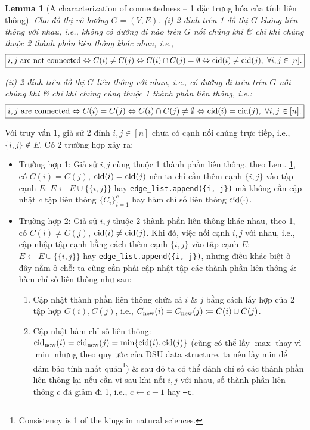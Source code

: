 \documentclass{article}
\newtheorem{lemma}{Lemma}
\begin{document}
\begin{lemma}[A characterization of connectedness -- 1 đặc trưng hóa của tính liên thông]
    \label{lem: characterization connectedness}
    Cho đồ thị vô hướng $G = (V,E)$.
    (i) 2 đỉnh trên 1 đồ thị $G$ không liên thông với nhau, i.e., không có đường đi nào trên $G$ nối chúng khi \& chỉ khi chúng thuộc 2 thành phần liên thông khác nhau, i.e.,
    \begin{equation*}
        \boxed{i,j\mbox{ are not connected}\Leftrightarrow C(i)\ne C(j)\Leftrightarrow C(i)\cap C(j) = \emptyset\Leftrightarrow{\rm cid}(i)\ne{\rm cid}(j),\ \forall i,j\in[n].}
    \end{equation*}
    \item(ii) 2 đỉnh trên đồ thị $G$ liên thông với nhau, i.e., có đường đi trên trên $G$ nối chúng khi \& chỉ khi chúng cùng thuộc 1 thành phần liên thông, i.e.:
    \begin{equation*}
        \boxed{i,j\mbox{ are connected}\Leftrightarrow C(i) = C(j)\Leftrightarrow C(i)\cap C(j)\ne\emptyset\Leftrightarrow{\rm cid}(i) = {\rm cid}(j),\ \forall i,j\in[n].}
    \end{equation*}
\end{lemma}
Với truy vấn 1, giả sử 2 đỉnh $i,j\in[n]$ chưa có cạnh nối chúng trực tiếp, i.e., $\{i,j\}\notin E$. Có 2 trường hợp xảy ra:
\begin{itemize}
    \item Trường hợp 1: Giả sử $i,j$ cùng thuộc 1 thành phần liên thông, theo Lem. \ref{lem: characterization connectedness}, có $C(i) = C(j)$, ${\rm cid}(i) = {\rm cid}(j)$ nên ta chỉ cần thêm cạnh $\{i,j\}$ vào tập cạnh $E$: $E\leftarrow E\cup\{\{i,j\}\}$ hay \verb|edge_list.append({i, j})| mà không cần cập nhật $c$ tập liên thông $\{C_i\}_{i=1}^c$ hay hàm chỉ số liên thông ${\rm cid}(\cdot)$.
    \item Trường hợp 2: Giả sử $i,j$ thuộc 2 thành phần liên thông khác nhau, theo \ref{lem: characterization connectedness}, có $C(i)\ne C(j)$, ${\rm cid}(i)\ne {\rm cid}(j)$. Khi đó, việc nối cạnh $i,j$ với nhau, i.e., cập nhập tập cạnh bằng cách thêm cạnh $\{i,j\}$ vào tập cạnh $E$: $E\leftarrow E\cup\{\{i,j\}\}$ hay \verb|edge_list.append({i, j})|, nhưng điều khác biệt ở đây nằm ở chỗ: ta cũng cần phải cập nhật tập các thành phần liên thông \& hàm chỉ số liên thông như sau:
    \begin{enumerate}
        \item Cập nhật thành phần liên thông chứa cả $i$ \& $j$ bằng cách lấy hợp của 2 tập hợp $C(i),C(j)$, i.e., $C_{\rm new}(i) = C_{\rm new}(j)\coloneqq C(i)\cup C(j)$.
        \item Cập nhật hàm chỉ số liên thông: ${\rm cid}_{\rm new}(i) = {\rm cid}_{\rm new}(j) = \min\{{\rm cid}(i),{\rm cid}(j)\}$ (cũng có thể lấy $\max$ thay vì $\min$ nhưng theo quy ước của DSU data structure, ta nên lấy min để đảm bảo tính nhất quán\footnote{Consistency is 1 of the kings in natural sciences.}) \& sau đó ta có thể đánh chỉ số các thành phần liên thông lại nếu cần vì sau khi nối $i,j$ với nhau, số thành phần liên thông $c$ đã giảm đi 1, i.e., $c\leftarrow c - 1$ hay {\tt--c}.
    \end{enumerate}
\end{itemize}
\end{document}
